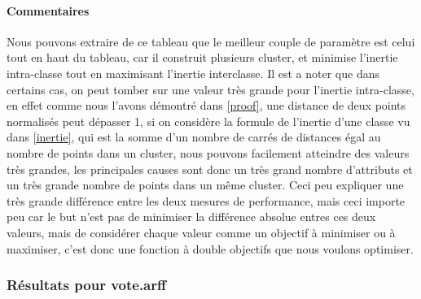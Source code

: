 		\paragraph{Commentaires}
			Nous pouvons extraire de ce tableau que le meilleur couple de paramètre est celui tout en haut du tableau, car il construit plusieurs cluster, et minimise l'inertie intra-classe tout en maximisant l'inertie interclasse. Il est a noter que dans certains cas, on peut tomber sur une valeur très grande pour l'inertie intra-classe, en effet comme nous l'avons démontré dans \ref{proof}, une distance de deux points normalisés peut dépasser 1, si on considère la formule de l'inertie d'une classe vu dans  \ref{inertie}, qui est la somme d'un nombre de carrés de distances égal au nombre de points dans un cluster, nous pouvons facilement atteindre des valeurs très grandes, les principales causes sont donc un très grand nombre d'attributs et un très grande nombre de points dans un même cluster. Ceci peu expliquer une très grande différence entre les deux mesures de performance, mais ceci importe peu car le but n'est pas de minimiser la différence absolue entres ces deux valeurs, mais de considérer chaque valeur comme un objectif à minimiser ou à maximiser, c'est donc une fonction à double objectifs que nous voulons optimiser.
		\subsubsection*{Résultats pour vote.arff }
		
